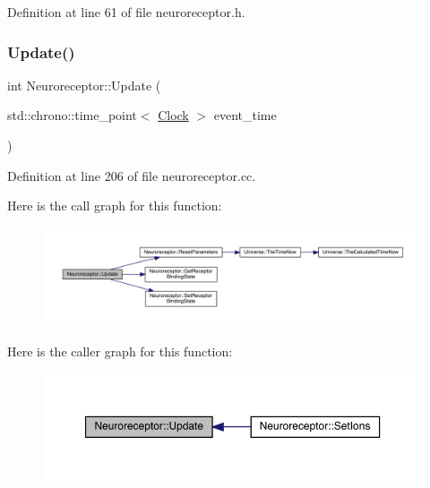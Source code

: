 Definition at line 61 of file neuroreceptor.\+h.

\mbox{\label{class_neuroreceptor_ab8f288a095fb028793e7246a42de233b}} 
\subsubsection{\texorpdfstring{Update()}{Update()}}
{\footnotesize\ttfamily int Neuroreceptor\+::\+Update (\begin{DoxyParamCaption}\item[{std\+::chrono\+::time\+\_\+point$<$ \hyperlink{universe_8h_a0ef8d951d1ca5ab3cfaf7ab4c7a6fd80}{Clock} $>$}]{event\+\_\+time }\end{DoxyParamCaption})}



Definition at line 206 of file neuroreceptor.\+cc.

Here is the call graph for this function\+:
\nopagebreak
\begin{figure}[H]
\begin{center}
\leavevmode
\includegraphics[width=350pt]{class_neuroreceptor_ab8f288a095fb028793e7246a42de233b_cgraph}
\end{center}
\end{figure}
Here is the caller graph for this function\+:
\nopagebreak
\begin{figure}[H]
\begin{center}
\leavevmode
\includegraphics[width=350pt]{class_neuroreceptor_ab8f288a095fb028793e7246a42de233b_icgraph}
\end{center}
\end{figure}


